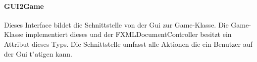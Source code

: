 \paragraph{GUI2Game}
\label{par:gui2Game}
Dieses Interface bildet die Schnittstelle von der Gui zur Game-Klasse. Die Game-Klasse implementiert dieses und der FXMLDocumentController besitzt ein Attribut dieses Typs. Die Schnittstelle umfasst alle Aktionen die ein Benutzer auf der Gui t"atigen kann. 